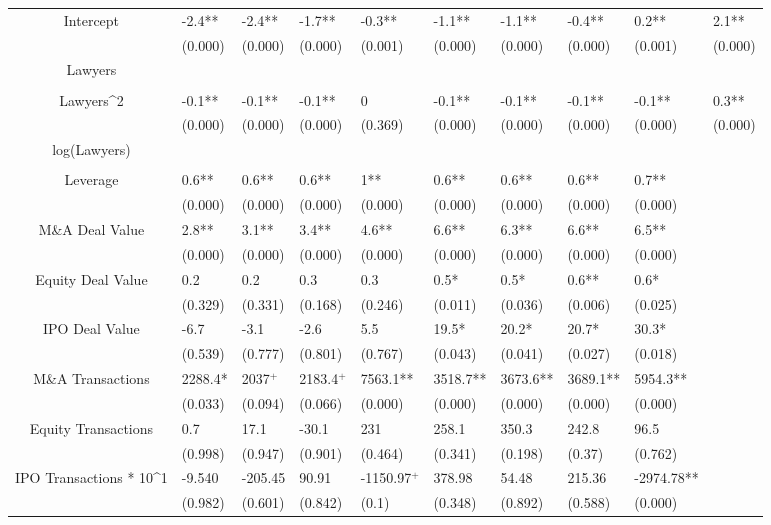 \documentclass{article}
\begin{document}
\begin{table}[H]
\begin{tabular}{|clllllllll|}
Intercept & -2.4** & -2.4** & -1.7** & -0.3** & -1.1** & -1.1** & -0.4** & 0.2** & 2.1** \\ 
   & (0.000) & (0.000) & (0.000) & (0.001) & (0.000) & (0.000) & (0.000) & (0.001) & (0.000) \\ 
  Lawyers &  &  &  &  &  &  &  &  &  \\ 
   &  &  &  &  &  &  &  &  &  \\ 
  Lawyers^2 & -0.1** & -0.1** & -0.1** & 0 & -0.1** & -0.1** & -0.1** & -0.1** & 0.3** \\ 
   & (0.000) & (0.000) & (0.000) & (0.369) & (0.000) & (0.000) & (0.000) & (0.000) & (0.000) \\ 
  log(Lawyers) &  &  &  &  &  &  &  &  &  \\ 
   &  &  &  &  &  &  &  &  &  \\ 
  Leverage & 0.6** & 0.6** & 0.6** & 1** & 0.6** & 0.6** & 0.6** & 0.7** &  \\ 
   & (0.000) & (0.000) & (0.000) & (0.000) & (0.000) & (0.000) & (0.000) & (0.000) &  \\ 
  M\&A Deal Value & 2.8** & 3.1** & 3.4** & 4.6** & 6.6** & 6.3** & 6.6** & 6.5** &  \\ 
   & (0.000) & (0.000) & (0.000) & (0.000) & (0.000) & (0.000) & (0.000) & (0.000) &  \\ 
  Equity Deal Value & 0.2 & 0.2 & 0.3 & 0.3 & 0.5* & 0.5* & 0.6** & 0.6* &  \\ 
   & (0.329) & (0.331) & (0.168) & (0.246) & (0.011) & (0.036) & (0.006) & (0.025) &  \\ 
  IPO Deal Value & -6.7 & -3.1 & -2.6 & 5.5 & 19.5* & 20.2* & 20.7* & 30.3* &  \\ 
   & (0.539) & (0.777) & (0.801) & (0.767) & (0.043) & (0.041) & (0.027) & (0.018) &  \\ 
  M\&A Transactions & 2288.4* & 2037$^{+}$ & 2183.4$^{+}$ & 7563.1** & 3518.7** & 3673.6** & 3689.1** & 5954.3** &  \\ 
   & (0.033) & (0.094) & (0.066) & (0.000) & (0.000) & (0.000) & (0.000) & (0.000) &  \\ 
  Equity Transactions & 0.7 & 17.1 & -30.1 & 231 & 258.1 & 350.3 & 242.8 & 96.5 &  \\ 
   & (0.998) & (0.947) & (0.901) & (0.464) & (0.341) & (0.198) & (0.37) & (0.762) &  \\ 
  IPO Transactions * 10^1 & -9.540 & -205.45 & 90.91 & -1150.97$^{+}$ & 378.98 & 54.48 & 215.36 & -2974.78** &  \\ 
   & (0.982) & (0.601) & (0.842) & (0.1) & (0.348) & (0.892) & (0.588) & (0.000) &  \\ 

\end{tabular}
\end{table}
\end{document}
